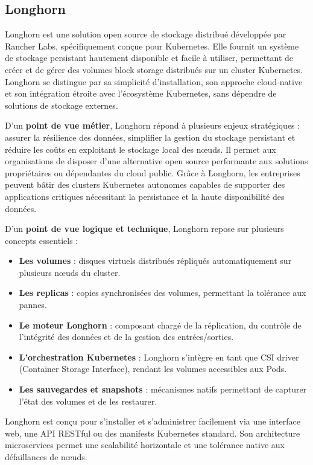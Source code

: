 \subsection{Longhorn}

Longhorn est une solution open source de stockage distribué développée par Rancher Labs, spécifiquement conçue pour Kubernetes. Elle fournit un système de stockage persistant hautement disponible et facile à utiliser, permettant de créer et de gérer des volumes block storage distribués sur un cluster Kubernetes. Longhorn se distingue par sa simplicité d’installation, son approche cloud-native et son intégration étroite avec l’écosystème Kubernetes, sans dépendre de solutions de stockage externes.

D’un \textbf{point de vue métier}, Longhorn répond à plusieurs enjeux stratégiques  : assurer la résilience des données, simplifier la gestion du stockage persistant et réduire les coûts en exploitant le stockage local des nœuds. Il permet aux organisations de disposer d’une alternative open source performante aux solutions propriétaires ou dépendantes du cloud public. Grâce à Longhorn, les entreprises peuvent bâtir des clusters Kubernetes autonomes capables de supporter des applications critiques nécessitant la persistance et la haute disponibilité des données.

D’un \textbf{point de vue logique et technique}, Longhorn repose sur plusieurs concepts essentiels  :
\begin{itemize}
	\item \textbf{Les volumes}  : disques virtuels distribués répliqués automatiquement sur plusieurs nœuds du cluster.
	\item \textbf{Les replicas}  : copies synchronisées des volumes, permettant la tolérance aux pannes.
	\item \textbf{Le moteur Longhorn}  : composant chargé de la réplication, du contrôle de l’intégrité des données et de la gestion des entrées/sorties.
	\item \textbf{L’orchestration Kubernetes}  : Longhorn s’intègre en tant que CSI driver (Container Storage Interface), rendant les volumes accessibles aux Pods.
	\item \textbf{Les sauvegardes et snapshots}  : mécanismes natifs permettant de capturer l’état des volumes et de les restaurer.
\end{itemize}

Longhorn est conçu pour s’installer et s’administrer facilement via une interface web, une API RESTful ou des manifests Kubernetes standard. Son architecture microservices permet une scalabilité horizontale et une tolérance native aux défaillances de nœuds.


